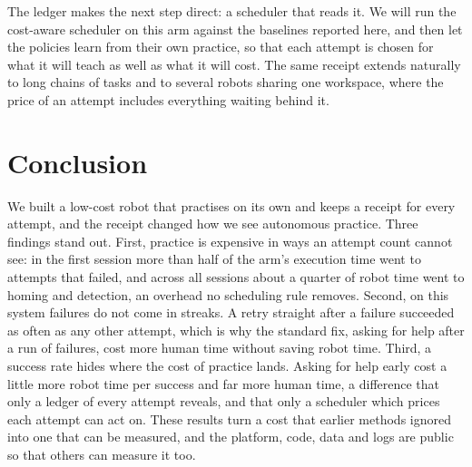 \documentclass[runningheads]{llncs}
\begin{document}
The ledger makes the next step direct: a scheduler that reads it. We will run the cost-aware scheduler on this arm against the baselines reported here, and then let the policies learn from their own practice, so that each attempt is chosen for what it will teach as well as what it will cost. The same receipt extends naturally to long chains of tasks and to several robots sharing one workspace, where the price of an attempt includes everything waiting behind it.

\section{Conclusion}
\label{sec:conclusion}

We built a low-cost robot that practises on its own and keeps a receipt for every attempt, and the receipt changed how we see autonomous practice. Three findings stand out. First, practice is expensive in ways an attempt count cannot see: in the first session more than half of the arm's execution time went to attempts that failed, and across all sessions about a quarter of robot time went to homing and detection, an overhead no scheduling rule removes. Second, on this system failures do not come in streaks. A retry straight after a failure succeeded as often as any other attempt, which is why the standard fix, asking for help after a run of failures, cost more human time without saving robot time. Third, a success rate hides where the cost of practice lands. Asking for help early cost a little more robot time per success and far more human time, a difference that only a ledger of every attempt reveals, and that only a scheduler which prices each attempt can act on. These results turn a cost that earlier methods ignored into one that can be measured, and the platform, code, data and logs are public so that others can measure it too.
\end{document}
